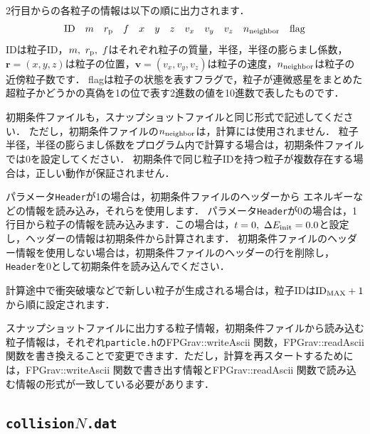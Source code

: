 \documentclass[12pt,a4paper,dvipdfmx]{jsarticle}
\begin{document}
2行目からの各粒子の情報は以下の順に出力されます．
\[
{\rm ID}\quad m\quad r_{\rm p}\quad f\quad x\quad y\quad z\quad v_{x}\quad v_{y} \quad v_{z}\quad n_{\rm neighbor} \quad {\rm flag}
\]
IDは粒子ID，$m,\ r_{\rm p},\ f$はそれぞれ粒子の質量，半径，半径の膨らまし係数，
$\bm{r}=(x,y,z)$は粒子の位置，$\bm{v}=(v_{x},v_{y},v_{z})$は粒子の速度，$n_{\rm neighbor}$は粒子の近傍粒子数です．
flagは粒子の状態を表すフラグで，粒子が連微惑星をまとめた超粒子かどうかの真偽を1の位で表す2進数の値を10進数で表したものです．


初期条件ファイルも，スナップショットファイルと同じ形式で記述してください．
ただし，初期条件ファイルの$n_{\rm neighbor}$は，計算には使用されません．
粒子半径，半径の膨らまし係数をプログラム内で計算する場合は，初期条件ファイルでは0を設定してください．
初期条件で同じ粒子IDを持つ粒子が複数存在する場合は，正しい動作が保証されません．

パラメータ\texttt{Header}が1の場合は，初期条件ファイルのヘッダーから
エネルギーなどの情報を読み込み，それらを使用します．
パラメータ\texttt{Header}が0の場合は，1行目から粒子の情報を読み込みます．この場合は，$t=0,\ \Delta E_{\rm init}=0.0$と設定し，ヘッダーの情報は初期条件から計算されます．
初期条件ファイルのヘッダー情報を使用しない場合は，初期条件ファイルのヘッダーの行を削除し，\texttt{Header}を0として初期条件を読み込んでください．

計算途中で衝突破壊などで新しい粒子が生成される場合は，粒子IDは${\rm ID}_{\rm MAX}+1$から順に設定されます．

スナップショットファイルに出力する粒子情報，初期条件ファイルから読み込む粒子情報は，それぞれ\texttt{particle.h}のFPGrav::writeAscii 関数，FPGrav::readAscii 関数を書き換えることで変更できます．ただし，計算を再スタートするためには，FPGrav::writeAscii 関数で書き出す情報とFPGrav::readAscii 関数で読み込む情報の形式が一致している必要があります．

\subsection{\texttt{collision}$N$\texttt{.dat}}
\end{document}
